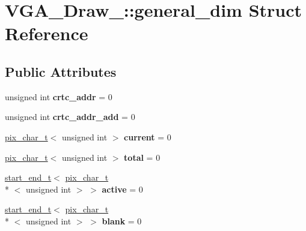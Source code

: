 \hypertarget{structVGA__Draw__2_1_1general__dim}{\section{V\-G\-A\-\_\-\-Draw\-\_\-:\-:general\-\_\-dim Struct Reference}
\label{structVGA__Draw__2_1_1general__dim}
}
\subsection*{Public Attributes}
\begin{DoxyCompactItemize}
\item 
\hypertarget{structVGA__Draw__2_1_1general__dim_ae59d71bff2050b005e5dd38a54363344}{unsigned int {\bfseries crtc\-\_\-addr} = 0}\label{structVGA__Draw__2_1_1general__dim_ae59d71bff2050b005e5dd38a54363344}

\item 
\hypertarget{structVGA__Draw__2_1_1general__dim_ad0e9fc90a4a4bf759cb8bb69dc81ec8d}{unsigned int {\bfseries crtc\-\_\-addr\-\_\-add} = 0}\label{structVGA__Draw__2_1_1general__dim_ad0e9fc90a4a4bf759cb8bb69dc81ec8d}

\item 
\hypertarget{structVGA__Draw__2_1_1general__dim_a958ab6a296afac1be649350e0320d836}{\hyperlink{structVGA__Draw__2_1_1pix__char__t}{pix\-\_\-char\-\_\-t}$<$ unsigned int $>$ {\bfseries current} = 0}\label{structVGA__Draw__2_1_1general__dim_a958ab6a296afac1be649350e0320d836}

\item 
\hypertarget{structVGA__Draw__2_1_1general__dim_a993a9b3a64894eab994789e5ffbe37d0}{\hyperlink{structVGA__Draw__2_1_1pix__char__t}{pix\-\_\-char\-\_\-t}$<$ unsigned int $>$ {\bfseries total} = 0}\label{structVGA__Draw__2_1_1general__dim_a993a9b3a64894eab994789e5ffbe37d0}

\item 
\hypertarget{structVGA__Draw__2_1_1general__dim_a41a82280943a048088ea2d1d52f63448}{\hyperlink{structVGA__Draw__2_1_1start__end__t}{start\-\_\-end\-\_\-t}$<$ \hyperlink{structVGA__Draw__2_1_1pix__char__t}{pix\-\_\-char\-\_\-t}\\*
$<$ unsigned int $>$ $>$ {\bfseries active} = 0}\label{structVGA__Draw__2_1_1general__dim_a41a82280943a048088ea2d1d52f63448}

\item 
\hypertarget{structVGA__Draw__2_1_1general__dim_a0769bd7feb04918eed94758c3122b03b}{\hyperlink{structVGA__Draw__2_1_1start__end__t}{start\-\_\-end\-\_\-t}$<$ \hyperlink{structVGA__Draw__2_1_1pix__char__t}{pix\-\_\-char\-\_\-t}\\*
$<$ unsigned int $>$ $>$ {\bfseries blank} = 0}\label{structVGA__Draw__2_1_1general__dim_a0769bd7feb04918eed94758c3122b03b}


\end{DoxyCompactItemize}
